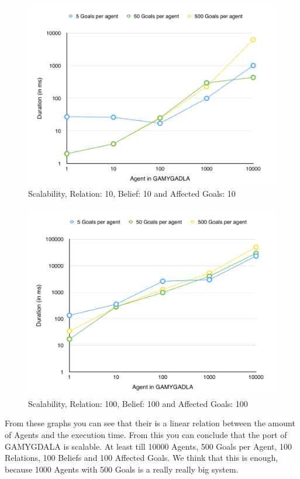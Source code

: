 \begin{figure}[H]
  \centering
  \includegraphics[scale=0.5]{scalability/2.jpg}
  \caption{Scalability, Relation: 10, Belief: 10 and Affected Goals: 10}
  \label{scala:second}
\end{figure}

\begin{figure}[H]
  \centering
  \includegraphics[scale=0.5]{scalability/3.jpg}
  \caption{Scalability, Relation: 100, Belief: 100 and Affected Goals: 100}
  \label{scala:third}
\end{figure}

From these graphs you can see that their is a linear relation between the amount of Agents and the execution time. From this you can conclude that the port of GAMYGDALA is scalable. At least till 10000 Agents, 500 Goals per Agent, 100 Relations, 100 Beliefs and 100 Affected Goals. We think that this is enough, because 1000 Agents with 500 Goals is a really really big system.